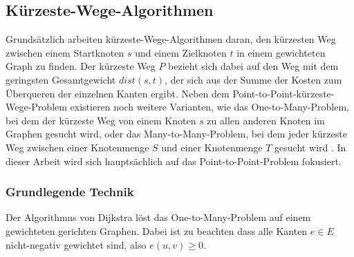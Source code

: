 \subsection{Kürzeste-Wege-Algorithmen}
Grundsätzlich arbeiten kürzeste-Wege-Algorithmen daran, den kürzesten Weg zwischen einem Startknoten
$s$ und einem Zielknoten $t$ in einem gewichteten Graph zu finden. Der kürzeste Weg $P$ bezieht sich
dabei auf den Weg mit dem geringsten Gesamtgewicht $dist(s,t)$, der sich aus der Summe der Kosten
zum Überqueren der einzelnen Kanten ergibt. Neben dem Point-to-Point-kürzeste-Wege-Problem
existieren noch weitere Varianten, wie das One-to-Many-Problem, bei dem der kürzeste Weg von einem
Knoten $s$ zu allen anderen Knoten im Graphen gesucht wird, oder das Many-to-Many-Problem, bei dem
jeder kürzeste Weg zwischen einer Knotenmenge $S$ und einer Knotenmenge $T$ gesucht wird
\cite{Bast.20.04.2015}. In dieser Arbeit wird sich hauptsächlich auf das Point-to-Point-Problem
fokusiert.\\

\subsubsection{Grundlegende Technik}
Der Algorithmus von Dijkstra löst das One-to-Many-Problem auf einem gewichteten gerichten Graphen.
Dabei ist zu beachten dass alle Kanten $e \in E$ nicht-negativ gewichtet sind, also $e(u,v) \geq 0$.

